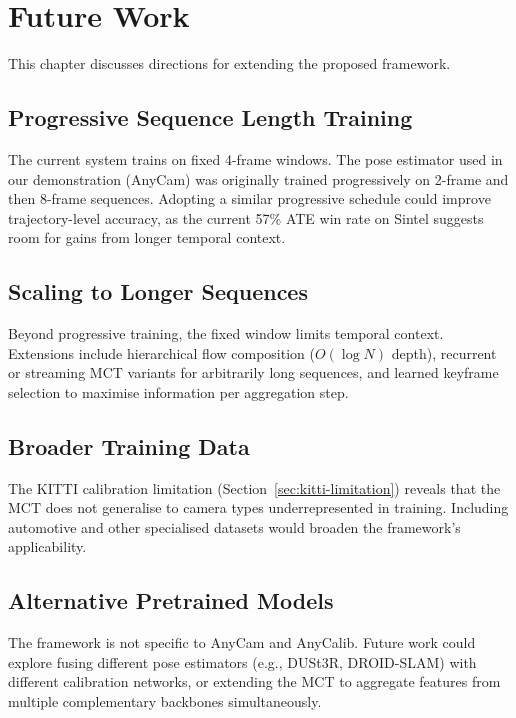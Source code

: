 
\chapter{Future Work}\label{chapter:future-work}

This chapter discusses directions for extending the proposed framework.

\section{Progressive Sequence Length Training}

The current system trains on fixed 4-frame windows. The pose estimator used in our demonstration (AnyCam) was originally trained progressively on 2-frame and then 8-frame sequences. Adopting a similar progressive schedule could improve trajectory-level accuracy, as the current 57\% ATE win rate on Sintel suggests room for gains from longer temporal context.

\section{Scaling to Longer Sequences}

Beyond progressive training, the fixed window limits temporal context. Extensions include hierarchical flow composition ($O(\log N)$ depth), recurrent or streaming MCT variants for arbitrarily long sequences, and learned keyframe selection to maximise information per aggregation step.

\section{Broader Training Data}

The KITTI calibration limitation (Section~\ref{sec:kitti-limitation}) reveals that the MCT does not generalise to camera types underrepresented in training. Including automotive and other specialised datasets would broaden the framework's applicability.

\section{Alternative Pretrained Models}

The framework is not specific to AnyCam and AnyCalib. Future work could explore fusing different pose estimators (e.g., DUSt3R, DROID-SLAM) with different calibration networks, or extending the MCT to aggregate features from multiple complementary backbones simultaneously.

